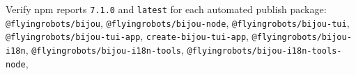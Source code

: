 \begin{enumerate}
  Verify npm reports \texttt{7\allowbreak{}.\allowbreak{}1\allowbreak{}.\allowbreak{}0} and \texttt{l\allowbreak{}a\allowbreak{}t\allowbreak{}e\allowbreak{}s\allowbreak{}t} for each automated publish package: \texttt{@\allowbreak{}f\allowbreak{}l\allowbreak{}y\allowbreak{}i\allowbreak{}n\allowbreak{}g\allowbreak{}r\allowbreak{}o\allowbreak{}b\allowbreak{}o\allowbreak{}t\allowbreak{}s\allowbreak{}/\allowbreak{}b\allowbreak{}i\allowbreak{}j\allowbreak{}o\allowbreak{}u}, \texttt{@\allowbreak{}f\allowbreak{}l\allowbreak{}y\allowbreak{}i\allowbreak{}n\allowbreak{}g\allowbreak{}r\allowbreak{}o\allowbreak{}b\allowbreak{}o\allowbreak{}t\allowbreak{}s\allowbreak{}/\allowbreak{}b\allowbreak{}i\allowbreak{}j\allowbreak{}o\allowbreak{}u\allowbreak{}-\allowbreak{}n\allowbreak{}o\allowbreak{}d\allowbreak{}e}, \texttt{@\allowbreak{}f\allowbreak{}l\allowbreak{}y\allowbreak{}i\allowbreak{}n\allowbreak{}g\allowbreak{}r\allowbreak{}o\allowbreak{}b\allowbreak{}o\allowbreak{}t\allowbreak{}s\allowbreak{}/\allowbreak{}b\allowbreak{}i\allowbreak{}j\allowbreak{}o\allowbreak{}u\allowbreak{}-\allowbreak{}t\allowbreak{}u\allowbreak{}i}, \texttt{@\allowbreak{}f\allowbreak{}l\allowbreak{}y\allowbreak{}i\allowbreak{}n\allowbreak{}g\allowbreak{}r\allowbreak{}o\allowbreak{}b\allowbreak{}o\allowbreak{}t\allowbreak{}s\allowbreak{}/\allowbreak{}b\allowbreak{}i\allowbreak{}j\allowbreak{}o\allowbreak{}u\allowbreak{}-\allowbreak{}t\allowbreak{}u\allowbreak{}i\allowbreak{}-\allowbreak{}a\allowbreak{}p\allowbreak{}p}, \texttt{c\allowbreak{}r\allowbreak{}e\allowbreak{}a\allowbreak{}t\allowbreak{}e\allowbreak{}-\allowbreak{}b\allowbreak{}i\allowbreak{}j\allowbreak{}o\allowbreak{}u\allowbreak{}-\allowbreak{}t\allowbreak{}u\allowbreak{}i\allowbreak{}-\allowbreak{}a\allowbreak{}p\allowbreak{}p}, \texttt{@\allowbreak{}f\allowbreak{}l\allowbreak{}y\allowbreak{}i\allowbreak{}n\allowbreak{}g\allowbreak{}r\allowbreak{}o\allowbreak{}b\allowbreak{}o\allowbreak{}t\allowbreak{}s\allowbreak{}/\allowbreak{}b\allowbreak{}i\allowbreak{}j\allowbreak{}o\allowbreak{}u\allowbreak{}-\allowbreak{}i\allowbreak{}1\allowbreak{}8\allowbreak{}n}, \texttt{@\allowbreak{}f\allowbreak{}l\allowbreak{}y\allowbreak{}i\allowbreak{}n\allowbreak{}g\allowbreak{}r\allowbreak{}o\allowbreak{}b\allowbreak{}o\allowbreak{}t\allowbreak{}s\allowbreak{}/\allowbreak{}b\allowbreak{}i\allowbreak{}j\allowbreak{}o\allowbreak{}u\allowbreak{}-\allowbreak{}i\allowbreak{}1\allowbreak{}8\allowbreak{}n\allowbreak{}-\allowbreak{}t\allowbreak{}o\allowbreak{}o\allowbreak{}l\allowbreak{}s}, \texttt{@\allowbreak{}f\allowbreak{}l\allowbreak{}y\allowbreak{}i\allowbreak{}n\allowbreak{}g\allowbreak{}r\allowbreak{}o\allowbreak{}b\allowbreak{}o\allowbreak{}t\allowbreak{}s\allowbreak{}/\allowbreak{}b\allowbreak{}i\allowbreak{}j\allowbreak{}o\allowbreak{}u\allowbreak{}-\allowbreak{}i\allowbreak{}1\allowbreak{}8\allowbreak{}n\allowbreak{}-\allowbreak{}t\allowbreak{}o\allowbreak{}o\allowbreak{}l\allowbreak{}s\allowbreak{}-\allowbreak{}n\allowbreak{}o\allowbreak{}d\allowbreak{}e}, 
\end{enumerate}
